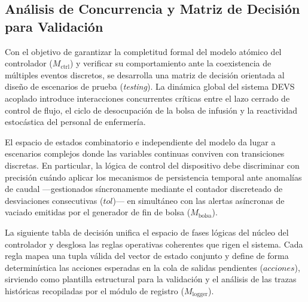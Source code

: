 \subsection{Análisis de Concurrencia y Matriz de Decisión para Validación}

Con el objetivo de garantizar la completitud formal del modelo atómico del controlador ($M_{\mathrm{ctrl}}$) y verificar su comportamiento ante la coexistencia de múltiples eventos discretos, se desarrolla una matriz de decisión orientada al diseño de escenarios de prueba (\textit{testing}). La dinámica global del sistema DEVS acoplado introduce interacciones concurrentes críticas entre el lazo cerrado de control de flujo, el ciclo de desocupación de la bolsa de infusión y la reactividad estocástica del personal de enfermería. 

El espacio de estados combinatorio e independiente del modelo da lugar a escenarios complejos donde las variables continuas conviven con transiciones discretas. En particular, la lógica de control del dispositivo debe discriminar con precisión cuándo aplicar los mecanismos de persistencia temporal ante anomalías de caudal —gestionados síncronamente mediante el contador discreteado de desviaciones consecutivas ($tol$)— en simultáneo con las alertas asíncronas de vaciado emitidas por el generador de fin de bolsa ($M_{\mathrm{bolsa}}$). 

La siguiente tabla de decisión unifica el espacio de fases lógicas del núcleo del controlador y desglosa las reglas operativas coherentes que rigen el sistema. Cada regla mapea una tupla válida del vector de estado conjunto y define de forma determinística las acciones esperadas en la cola de salidas pendientes ($\mathit{acciones}$), sirviendo como plantilla estructural para la validación y el análisis de las trazas históricas recopiladas por el módulo de registro ($M_{\mathrm{logger}}$).

